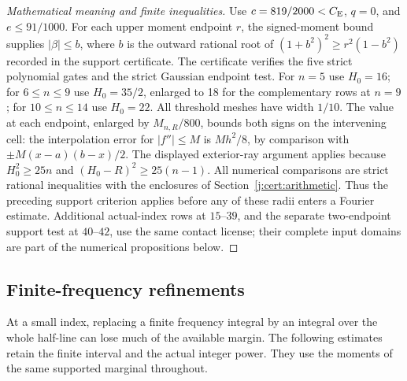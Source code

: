 \begin{proof}[Mathematical meaning and finite inequalities]
Use $c=819/2000<C_{\mathrm E}$, $q=0$, and $e\le91/1000$.
For each upper moment endpoint $r$, the signed-moment bound supplies
$|\beta|\le b$, where $b$ is the outward rational root of
$(1+b^2)^2\ge r^2(1-b^2)$ recorded in the support certificate.
The certificate verifies the five strict polynomial gates and the strict
Gaussian endpoint test. For $n=5$ use $H_0=16$; for $6\le n\le9$
use $H_0=35/2$, enlarged to 18 for the complementary rows at $n=9$;
for $10\le n\le14$ use $H_0=22$. All threshold meshes have width
$1/10$. The value at each endpoint, enlarged by $M_{n,R}/800$,
bounds both signs on the intervening cell: the interpolation error for
$|f''|\le M$ is $M h^2/8$, by comparison with
$\pm M(x-a)(b-x)/2$. The displayed exterior-ray argument applies
because $H_0^2\ge25n$ and $(H_0-R)^2\ge25(n-1)$.
All numerical comparisons are strict rational inequalities with the
enclosures of Section~\ref{j:cert:arithmetic}. Thus the preceding support
criterion applies before any of these radii enters a Fourier estimate.
Additional actual-index rows at $15$--$39$, and the separate two-endpoint
support test at $40$--$42$, use the same contact license; their complete
input domains are part of the numerical propositions below.
\end{proof}

\subsection{Finite-frequency refinements}
\label{j:finite:small-fourier}
At a small index, replacing a finite frequency integral by an integral
over the whole half-line can lose much of the available margin. The
following estimates retain the finite interval and the actual integer
power. They use the moments of the same supported marginal throughout.

